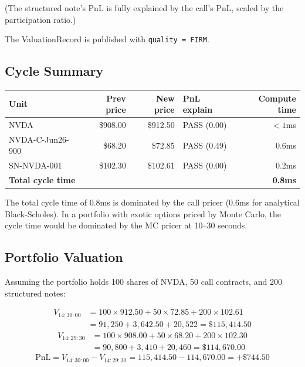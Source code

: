 \documentclass[11pt,a4paper]{article}
\begin{document}
(The structured note's PnL is fully explained by the call's PnL, scaled by the participation ratio.)

The ValuationRecord is published with \texttt{quality = FIRM}.

\subsection{Cycle Summary}

\begin{center}
\small
\begin{tabular}{l r r l r}
\toprule
\textbf{Unit} & \textbf{Prev price} & \textbf{New price} & \textbf{PnL explain} & \textbf{Compute time} \\
\midrule
NVDA & \$908.00 & \$912.50 & PASS (0.00) & $<1$ms \\
NVDA-C-Jun26-900 & \$68.20 & \$72.85 & PASS (0.49) & 0.6ms \\
SN-NVDA-001 & \$102.30 & \$102.61 & PASS (0.00) & 0.2ms \\
\midrule
\multicolumn{4}{l}{\textbf{Total cycle time}} & \textbf{0.8ms} \\
\bottomrule
\end{tabular}
\end{center}

\noindent The total cycle time of 0.8ms is dominated by the call pricer (0.6ms for analytical Black-Scholes).  In a portfolio with exotic options priced by Monte Carlo, the cycle time would be dominated by the MC pricer at 10--30 seconds.

\subsection{Portfolio Valuation}

Assuming the portfolio holds 100 shares of NVDA, 50 call contracts, and 200 structured notes:

\begin{align*}
V_{14:30:00} &= 100 \times 912.50 + 50 \times 72.85 + 200 \times 102.61 \\
&= 91{,}250 + 3{,}642.50 + 20{,}522 = \$115{,}414.50
\end{align*}
\begin{align*}
V_{14:29:30} &= 100 \times 908.00 + 50 \times 68.20 + 200 \times 102.30 \\
&= 90{,}800 + 3{,}410 + 20{,}460 = \$114{,}670.00
\end{align*}
\[
\mathrm{PnL} = V_{14:30:00} - V_{14:29:30} = 115{,}414.50 - 114{,}670.00 = +\$744.50
\]
\end{document}
